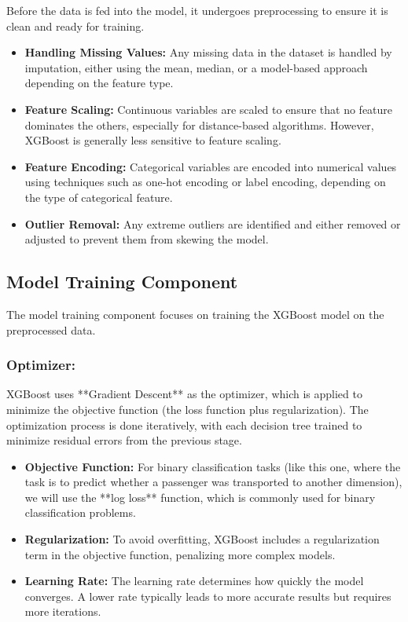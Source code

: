 \documentclass[15pt]{article}
\begin{document}
Before the data is fed into the model, it undergoes preprocessing to ensure it is clean and ready for training.

\begin{itemize}
    \item \textbf{Handling Missing Values:} Any missing data in the dataset is handled by imputation, either using the mean, median, or a model-based approach depending on the feature type.
    \item \textbf{Feature Scaling:} Continuous variables are scaled to ensure that no feature dominates the others, especially for distance-based algorithms. However, XGBoost is generally less sensitive to feature scaling.
    \item \textbf{Feature Encoding:} Categorical variables are encoded into numerical values using techniques such as one-hot encoding or label encoding, depending on the type of categorical feature.
    \item \textbf{Outlier Removal:} Any extreme outliers are identified and either removed or adjusted to prevent them from skewing the model.
\end{itemize}

\subsection{Model Training Component}

The model training component focuses on training the XGBoost model on the preprocessed data.

\subsubsection{Optimizer:}

XGBoost uses **Gradient Descent** as the optimizer, which is applied to minimize the objective function (the loss function plus regularization). The optimization process is done iteratively, with each decision tree trained to minimize residual errors from the previous stage.

\begin{itemize}
    \item \textbf{Objective Function:} For binary classification tasks (like this one, where the task is to predict whether a passenger was transported to another dimension), we will use the **log loss** function, which is commonly used for binary classification problems.
    \item \textbf{Regularization:} To avoid overfitting, XGBoost includes a regularization term in the objective function, penalizing more complex models.
    \item \textbf{Learning Rate:} The learning rate determines how quickly the model converges. A lower rate typically leads to more accurate results but requires more iterations.
\end{itemize}
\end{document}
